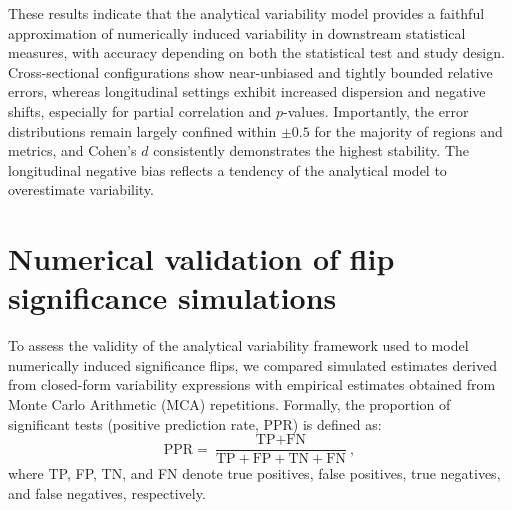 These results indicate that the analytical variability model provides a
faithful approximation of numerically induced variability in downstream
statistical measures, with accuracy depending on both the statistical test and
study design. Cross-sectional configurations show near-unbiased and tightly
bounded relative errors, whereas longitudinal settings exhibit increased
dispersion and negative shifts, especially for partial correlation and
$p$-values. Importantly, the error distributions remain largely confined within
$\pm0.5$ for the majority of regions and metrics, and Cohen's $d$ consistently
demonstrates the highest stability. The longitudinal negative bias reflects a
tendency of the analytical model to overestimate variability.



\section{Numerical validation of flip significance simulations\label{appendix:numerical_validation_flip_significance}}

To assess the validity of the analytical variability framework used to model
numerically induced significance flips, we compared simulated estimates
derived from closed-form variability expressions with empirical estimates
obtained from Monte Carlo Arithmetic (MCA) repetitions. Formally, the
proportion of significant tests (positive prediction rate, PPR) is defined as:
\begin{equation}
    \text{PPR} = \frac{\text{TP} + \text{FN}}{\text{TP} + \text{FP} + \text{TN} + \text{FN}},
    \label{eq:ppr}
\end{equation}
where TP, FP, TN, and FN denote true positives, false positives, true negatives,
and false negatives, respectively.

